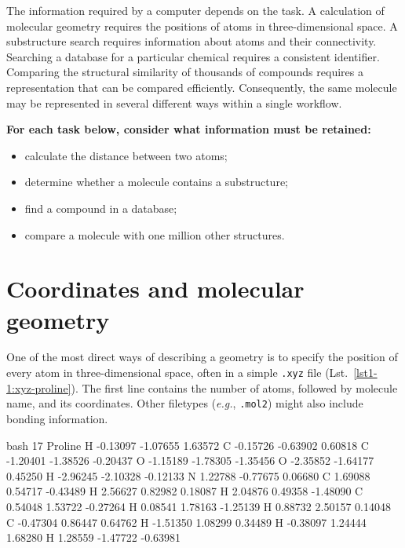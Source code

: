 The information required by a computer depends on the task.
A calculation of molecular geometry requires the positions of atoms in three-dimensional space.
A substructure search requires information about atoms and their connectivity.
Searching a database for a particular chemical requires a consistent identifier.
Comparing the structural similarity of thousands of compounds requires a representation that can be compared efficiently.
Consequently, the same molecule may be represented in several different ways within a single workflow.

\begin{resultbox}
    \textbf{For each task below, consider what information must be retained:} \vspace{0.5em}
    \begin{itemize}
        \item calculate the distance between two atoms;
        \item determine whether a molecule contains a substructure;
        \item find a compound in a database;
        \item compare a molecule with one million other structures.
    \end{itemize}
\end{resultbox}

\section{Coordinates and molecular geometry}

One of the most direct ways of describing a geometry is to specify the position of every atom in three-dimensional space, often in a simple \texttt{.xyz} file (Lst.~\ref{lst1-1:xyz-proline}).
The first line contains the number of atoms, followed by molecule name, and its coordinates.
Other filetypes (\emph{e.g.}, \texttt{.mol2}) might also include bonding information.

\begin{listing}
\begin{codebox}{bash}
17
Proline
   H       -0.13097       -1.07655        1.63572
   C       -0.15726       -0.63902        0.60818
   C       -1.20401       -1.38526       -0.20437
   O       -1.15189       -1.78305       -1.35456
   O       -2.35852       -1.64177        0.45250
   H       -2.96245       -2.10328       -0.12133
   N        1.22788       -0.77675        0.06680
   C        1.69088        0.54717       -0.43489
   H        2.56627        0.82982        0.18087
   H        2.04876        0.49358       -1.48090
   C        0.54048        1.53722       -0.27264
   H        0.08541        1.78163       -1.25139
   H        0.88732        2.50157        0.14048
   C       -0.47304        0.86447        0.64762
   H       -1.51350        1.08299        0.34489
   H       -0.38097        1.24444        1.68280
   H        1.28559       -1.47722       -0.63981
\end{codebox}
\caption{Proline geometry as an \texttt{.xyz} file.}
\label{lst1-1:xyz-proline}
\end{listing}

